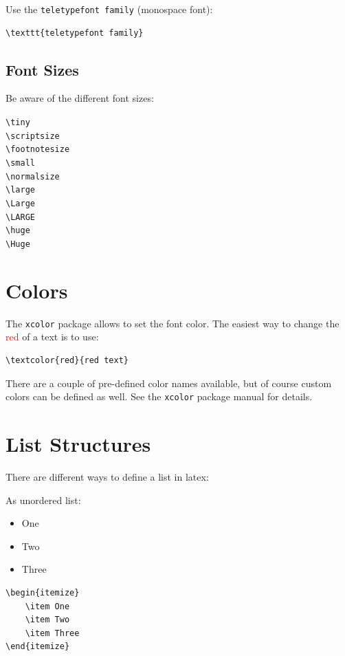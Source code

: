Use the \texttt{teletypefont family} (monospace font):
\begin{verbatim}
\texttt{teletypefont family}
\end{verbatim}


\subsection{Font Sizes}

Be aware of the different font sizes:

{\tiny \texttt{\textbackslash tiny}}\\
{\scriptsize \texttt{\textbackslash scriptsize}}\\
{\footnotesize \texttt{\textbackslash footnotesize}}\\
{\small \texttt{\textbackslash small}}\\
{\normalsize \texttt{\textbackslash normalsize}}\\
{\large \texttt{\textbackslash large}}\\
{\Large \texttt{\textbackslash Large}}\\
{\LARGE \texttt{\textbackslash LARGE}}\\
{\huge \texttt{\textbackslash huge}}\\
{\Huge \texttt{\textbackslash Huge}}\\


\section{Colors}
The \texttt{xcolor} package allows to set the font color. The easiest way to change the \textcolor{red}{red} of a text is to use:
\begin{verbatim}
\textcolor{red}{red text}
\end{verbatim}
There are a couple of pre-defined color names available, but of course custom colors can be defined as well. See the \texttt{xcolor} package manual for details.


\section{List Structures}
There are different ways to define a list in latex:

As unordered list:
\begin{itemize}
    \item One
    \item Two
    \item Three
\end{itemize}
\begin{verbatim}
\begin{itemize}
    \item One
    \item Two
    \item Three
\end{itemize}
\end{verbatim}


